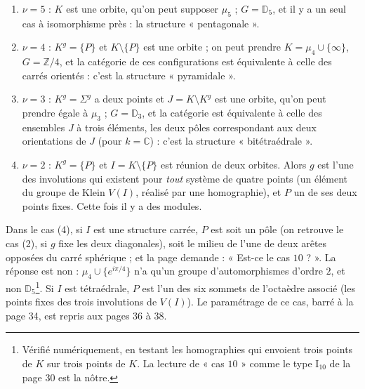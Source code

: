 \documentclass[11pt,a4paper]{article}
\begin{document}
\begin{enumerate}
\item[(1)] $\nu = 5$ : $K$ est une orbite, qu'on peut supposer $\mu_5$ ; $G =
\mathbb{D}_5$, et il y a un seul cas à isomorphisme près : la structure
« pentagonale ».
\item[(2)] $\nu = 4$ : $K^{g} = \{P\}$ et $K \setminus \{P\}$ est une orbite ;
on peut prendre $K = \mu_4 \cup \{\infty\}$, $G = \mathbb{Z}/4$, et la catégorie
de ces configurations est équivalente à celle des carrés orientés : c'est la
structure « pyramidale ».
\item[(3)] $\nu = 3$ : $K^{g} = \Sigma^{g}$ a deux points et $J = K \setminus
K^{g}$ est une orbite, qu'on peut prendre égale à $\mu_3$ ; $G = \mathbb{D}_3$,
et la catégorie est équivalente à celle des ensembles $J$ à trois éléments, les
deux pôles correspondant aux deux orientations de $J$ (pour $k = \mathbb{C}$) :
c'est la structure « bitétraédrale ».
\item[(4)] $\nu = 2$ : $K^{g} = \{P\}$ et $I = K \setminus \{P\}$ est réunion de
deux orbites. Alors $g$ est l'une des involutions qui existent pour \emph{tout}
système de quatre points (un élément du groupe de Klein $V(I)$, réalisé par
une homographie), et $P$ un de ses deux points fixes. Cette fois il y a des
modules.
\end{enumerate}

Dans le cas (4), si $I$ est une structure carrée, $P$ est soit un pôle (on
retrouve le cas (2), si $g$ fixe les deux diagonales), soit le milieu de l'une
de deux arêtes opposées du carré sphérique ; et la page demande : « Est-ce le cas
$10$ ? ». La réponse est non : $\mu_4 \cup \{e^{i\pi/4}\}$ n'a qu'un groupe
d'automorphismes d'ordre $2$, et non $\mathbb{D}_5$\footnote{Vérifié
numériquement, en testant les homographies qui envoient trois points de $K$ sur
trois points de $K$. La lecture de « cas $10$ » comme le type $\mathrm{I}_{10}$
de la page 30 est la nôtre.}. Si $I$ est tétraédrale, $P$ est l'un des six
sommets de l'octaèdre associé (les points fixes des trois involutions de $V(I)$).
Le paramétrage de ce cas, barré à la page 34, est repris aux pages 36 à 38.
\end{document}
